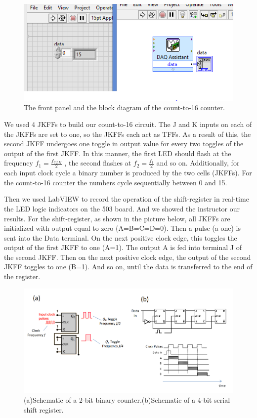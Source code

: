 \documentclass[11pt]{article}
\begin{document}
\begin{figure}[H]
 \begin{center}
  \includegraphics[width=\linewidth/2]{act4_4}
  \caption{The front panel and the block diagram of the count-to-16 counter.}
  \label{fig:act4_4}
 \end{center}
\end{figure}

We used 4 JKFFs to build our count-to-16 circuit. The J and K inputs on each of the JKFFs are set to one, so the JKFFs each act as TFFs. As a result of this, the second JKFF undergoes one toggle in output value for every two toggles of the output of the first JKFF. In this manner, the first LED should flash at the frequency $f_{1} = \frac{f_{CLK}}{2}$ , the second flashes at $f_{2} = \frac{f_{1}}{2}$ and so on. Additionally, for each input clock cycle a binary number is produced by the two cells (JKFFs). For the count-to-16 counter the  numbers  cycle sequentially between 0 and 15.  

\vbox{}

Then we used LabVIEW to record the operation of the shift-register in real-time the LED logic indicators on the 503 board. And we showed the instructor our results. For the shift-register, as shown in the picture below, all JKFFs are initialized with output equal to zero (A=B=C=D=0).  
Then a pulse (a one) is sent into the Data terminal. On the next positive clock edge, this toggles the output of the first JKFF to one (A=1). The output A is fed into terminal J of the second JKFF. Then on the next 
positive clock edge, the output of the second JKFF toggles to one (B=1). And so on, until the data is transferred to the end of the register.

\begin{figure}[H]
 \begin{center}
  \includegraphics[width=\linewidth/2]{act4_6}
  \caption{(a)Schematic of a 2-bit binary counter.(b)Schematic of a 4-bit serial shift register.}
  \label{fig:act4_6}
 \end{center}
\end{figure}
\end{document}
